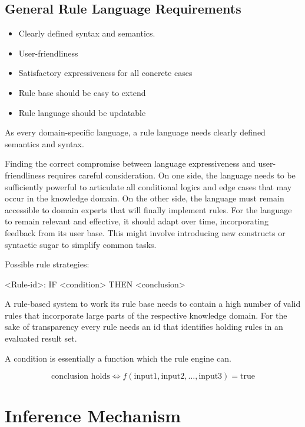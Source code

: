 \subsection{General Rule Language Requirements}\label{subsec:general-rule-language-requirements}

\begin{itemize}
    \item Clearly defined syntax and semantics.
    \item User-friendliness
    \item Satisfactory expressiveness for all concrete cases
    \item Rule base should be easy to extend
    \item Rule language should be updatable
\end{itemize}

As every domain-specific language, a rule language needs clearly defined semantics and syntax.


Finding the correct compromise between language expressiveness and user-friendliness\cite{https://doi.org/10.1002/widm.11} requires careful consideration.
On one side,
the language needs
to be sufficiently powerful to articulate all conditional logics and edge cases that may occur in the knowledge domain.
On the other side, the language must remain accessible to domain experts that will finally implement rules.
For the language to remain relevant and effective, it should adapt over time, incorporating feedback from its user base.
This might involve introducing new constructs or syntactic sugar to simplify common tasks.


Possible rule strategies:

<Rule-id>: IF <condition> THEN <conclusion>

A rule-based system to work its rule base needs
to contain a high number of valid rules that incorporate large parts of the respective knowledge domain.
For the sake of transparency every rule needs an id that identifies holding rules in an evaluated result set.

A condition is essentially a function which the rule engine can.

\[
    \text{conclusion holds} \Leftrightarrow f(\text{input1}, \text{input2}, \ldots, \text{input3}) = \text{true}
\]

\section{Inference Mechanism}\label{sec:inference-mechanism}

